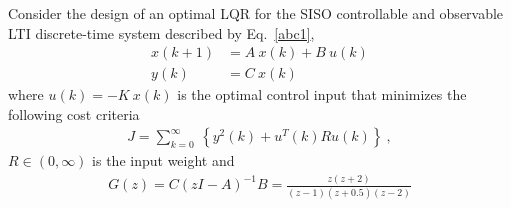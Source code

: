 \item
Consider the design of an optimal LQR for the SISO controllable and observable LTI discrete-time system described by Eq.~\eqref{abc1},
\begin{align*}
    x(k+1) & = A \: x(k) + B \: u(k)\\
    y(k) & = C \: x(k) \, \nonumber
\end{align*}
where $u(k) = -K \: x(k)$ is the optimal control input that minimizes the following cost criteria
\begin{align*}
    J = \sum_{k=0}^\infty \: \left \{ y^2(k) + u^T(k) R u(k) \right \} \:,
\end{align*}
$R \in (0,\infty)$ is the input weight and
\begin{align}
    \label{gz1}
    G(z) = C(zI - A)^{-1}B = \frac{z(z+2)}{(z-1)(z+0.5)(z-2)}\\[1em] \nonumber
\end{align}

